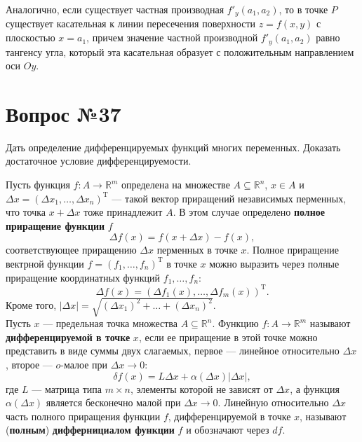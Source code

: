 \documentclass[12pt]{report}
\numberwithin{equation}{section}
\begin{document}
Аналогично, если существует частная производная $f'_y(a_1, a_2)$, то в точке $P$ существует касательная к линии пересечения поверхности $z = f(x,y)$ с плоскостью $x = a_1$, причем значение частной производной $f'_y(a_1, a_2)$ равно тангенсу угла, который эта касательная образует с положительным направлением оси $Oy$.

\newpage \section{Вопрос №37} %
\begin{framed}
Дать определение дифференцируемых функций многих переменных. Доказать достаточное
условие дифференцируемости.
\end{framed}
Пусть функция $f : A \to \mathbb{R}^m$ определена  на множестве $A \subseteq \mathbb{R}^n$, $x \in A$ и $\Delta x = (\Delta x_1, \ldots, \Delta x_n)^{\mathrm{T}}$ --- такой вектор приращений независимых перменных, что точка $x + \Delta x$ тоже принадлежит $A$. В этом случае определено \textbf{полное приращение функции} $f$
\[ \Delta f(x) = f(x + \Delta x) - f(x),\]
соответствующее приращению $\Delta x$ перменных в точке $x$. Полное приращение вектрной функции $f = (f_1, \ldots, f_n)^{\mathrm{T}}$ в точке $x$ можно выразить через полные приращение координатных функций $f_1, \ldots, f_n$:
\begin{equation} \label{eq:37:1} \Delta f(x) = (\Delta f_1(x), \ldots, \Delta f_m(x))^{\mathrm{T}}. \end{equation}
Кроме того, $|\Delta x| = \sqrt{(\Delta x_1)^2 + \dots + (\Delta x_n)^2}$.\\


Пусть $x$ --- предельная точка множества $A \subseteq \mathbb{R}^n$. Функцию $f: A \to \mathbb{R}^m$ называют \textbf{дифференцируемой в точке} $x$, если ее приращение в этой точке можно представить в виде суммы двух слагаемых, первое --- линейное относительно $\Delta x$, второе --- $o$-малое при $\Delta x \to 0$:
\begin{equation} \label{eq:37:2}
\delta f(x) = L \Delta x + \alpha(\Delta x)|\Delta x|,
\end{equation}
где $L$ --- матрица типа $m \times n$, элементы которой не зависят от $\Delta x$, а функция $\alpha(\Delta x)$ является бесконечно малой при $\Delta x \to 0$. Линейную относительно $\Delta x$ часть полного приращения функции $f$, дифференцируемой в точке $x$, называют (\textbf{полным}) \textbf{диффернициалом функции} $f$ и обозначают через $df$.\\
\end{document}
